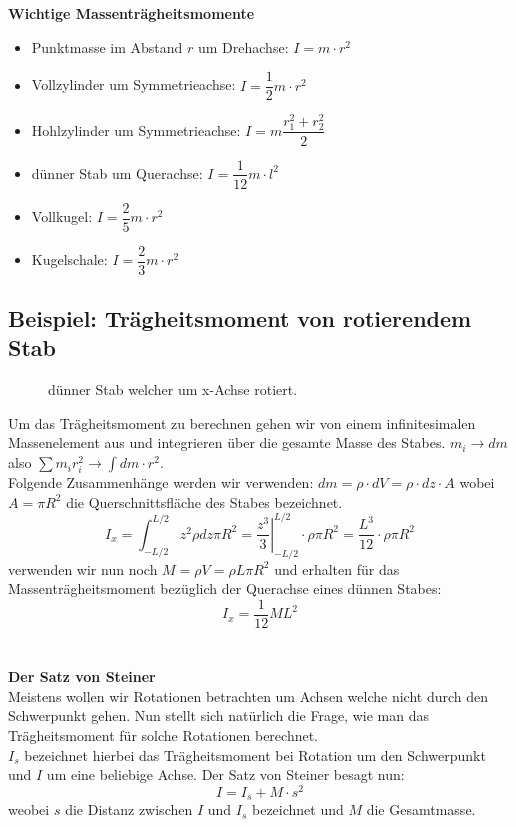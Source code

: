 \documentclass[12pt]{article}
\begin{document}
\textbf{Wichtige Massenträgheitsmomente}
\begin{itemize}
\item Punktmasse im Abstand $r$ um Drehachse: $I = m\cdot r^2$
\item Vollzylinder um Symmetrieachse: $I = \dfrac{1}{2}m\cdot r^2$
\item Hohlzylinder um Symmetrieachse: $I = m \dfrac{r_1^2 + r_2^2}{2}$
\item dünner Stab um Querachse: $I = \dfrac{1}{12}m \cdot l^2$
\item Vollkugel: $I = \dfrac{2}{5}m \cdot r^2$
\item Kugelschale: $I = \dfrac{2}{3}m \cdot r^2$
\end{itemize}

\subsection{Beispiel: Trägheitsmoment von rotierendem Stab}

\begin{figure}[H]
  \caption{dünner Stab welcher um x-Achse rotiert.}
  \label{fig:1teil}
\end{figure} 

Um das Trägheitsmoment zu berechnen gehen wir von einem infinitesimalen Massenelement aus und integrieren über die gesamte Masse des Stabes. $m_i \rightarrow dm$ also $\sum m_i r_i^2 \rightarrow \int dm \cdot r^2$.\\
Folgende Zusammenhänge werden wir verwenden: $dm = \rho \cdot dV = \rho \cdot dz \cdot A$ wobei $A = \pi R^2$ die Querschnittsfläche des Stabes bezeichnet.
\begin{equation}
I_x = \int_{-L/2}^{L/2} z^2 \rho dz \pi R^2 = \left. \dfrac{z^3}{3} \right|_{-L/2}^{L/2} \cdot \rho \pi R^2 = \dfrac{L^3}{12} \cdot \rho \pi R^2
\end{equation}
verwenden wir nun noch $M = \rho V = \rho L \pi R^2$ und erhalten für das Massenträgheitsmoment bezüglich der Querachse eines dünnen Stabes:
\begin{equation}
I_x = \dfrac{1}{12} ML^2
\end{equation}
\\
\\
\textbf{Der Satz von Steiner}
\\
Meistens wollen wir Rotationen betrachten um Achsen welche nicht durch den Schwerpunkt gehen. Nun stellt sich natürlich die Frage, wie man das Trägheitsmoment für solche Rotationen berechnet.\\
$I_s$ bezeichnet hierbei das Trägheitsmoment bei Rotation um den Schwerpunkt und $I$ um eine beliebige Achse. Der Satz von Steiner besagt nun:
\begin{equation}
I = I_s + M \cdot s^2
\end{equation}
weobei $s$ die Distanz zwischen $I$ und $I_s$ bezeichnet und $M$ die Gesamtmasse.
\end{document}

